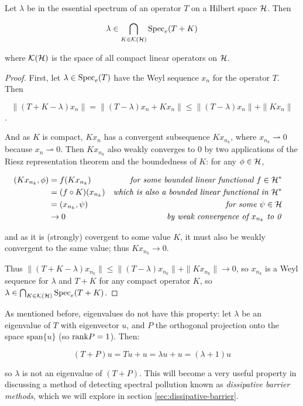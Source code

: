\documentclass[../main.tex]{subfiles}
\begin{document}
\begin{theorem}
Let $\lambda$ be in the essential spectrum of an operator $T$ on a Hilbert space $\mathcal{H}$. Then

\begin{equation}\label{eqn:weyl_spectrum}
\lambda \in \bigcap_{K \in \mathcal{K}(\mathcal{H})} \mathrm{Spec}_e(T + K)
\end{equation}

where $\mathcal{K}(\mathcal{H})$ is the space of all compact linear operators on $\mathcal{H}$.
\end{theorem}
\begin{proof}
First, let $\lambda \in \mathrm{Spec}_e(T)$ have the Weyl sequence $x_n$ for the operator $T$. Then 

$$\|(T+K-\lambda)x_n\| = \|(T - \lambda)x_n+Kx_n\| \leq \|(T - \lambda)x_n\| + \|Kx_n\|$$. 

And as $K$ is compact, $Kx_n$ has a convergent subsequence $Kx_{n_k}$, where $x_{n_k} \rightharpoonup 0$ because $x_n \rightharpoonup 0$.
Then $Kx_{n_k}$ also weakly converges to 0 by two applications of the Riesz representation theorem and the boundedness of $K$: for any $\phi \in \mathcal{H}$,

\begin{align*}
(Kx_{n_k}, \phi) & = f(Kx_{n_k}) & \text{\emph{for some bounded linear functional $f \in \mathcal{H}^*$}}\\
& = (f \circ K) (x_{n_k}) & \text{\emph{which is also a bounded linear functional in $\mathcal{H}^*$}}\\
& = (x_{n_k}, \psi) & \text{\emph{for some $\psi \in \mathcal{H}$}}&\\
& \rightarrow 0 & \text{\emph{by weak convergence of $x_{n_k}$ to 0}}
\end{align*}

and as it is (strongly) covergent to some value $K$, it must also be weakly convergent to the same value; thus $Kx_{n_k} \rightarrow 0$.

Thus $\|(T+K-\lambda)x_{n_k}\| \leq \|(T - \lambda)x_{n_k}\| + \|Kx_{n_k}\| \rightarrow 0$, so $x_{n_k}$ is a Weyl sequence for $\lambda$ and $T+K$ 
for any compact operator $K$, so $\lambda \in \bigcap_{K \in \mathcal{K}(\mathcal{H})} \mathrm{Spec}_e(T + K)$.
\end{proof}

\begin{remark}
As mentioned before, eigenvalues do not have this property: let $\lambda$ be an eigenvalue of $T$ with eigenvector $u$, and $P$ the orthogonal 
projection onto the space $\mathrm{span}\{u\}$ (so $\mathrm{rank} P = 1$). Then:

$$(T+P) u = Tu + u = \lambda u + u = (\lambda + 1)u$$

so $\lambda$ is not an eigenvalue of $(T+P)$. This will become a very useful property in discussing a method of detecting spectral pollution known as 
\emph{dissipative barrier methods}, which we will explore in section \ref{sec:dissipative-barrier}.
\end{remark}
\end{document}
